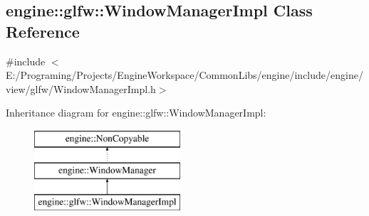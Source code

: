 \hypertarget{a00090}{}\subsection{engine\+:\+:glfw\+:\+:Window\+Manager\+Impl Class Reference}
\label{a00090}


{\ttfamily \#include $<$E\+:/\+Programing/\+Projects/\+Engine\+Workspace/\+Common\+Libs/engine/include/engine/view/glfw/\+Window\+Manager\+Impl.\+h$>$}

Inheritance diagram for engine\+:\+:glfw\+:\+:Window\+Manager\+Impl\+:\begin{figure}[H]
\begin{center}
\leavevmode
\includegraphics[height=3.000000cm]{a00090}
\end{center}
\end{figure}

